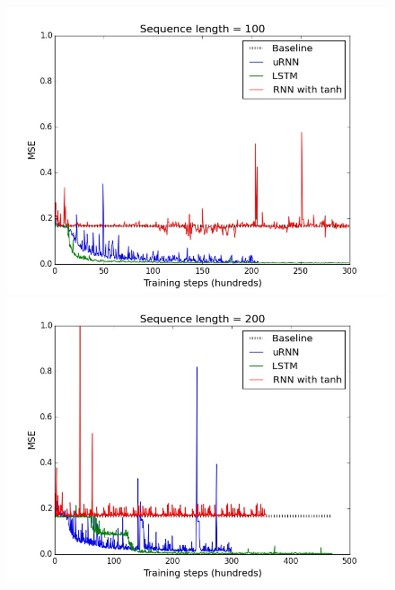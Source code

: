 \documentclass{article} %
\begin{document}
\begin{figure}[t!] 
  \begin{minipage}[b]{0.5\linewidth}
    \centering
    \includegraphics[scale=0.25]{figures/adding_100.jpeg}
  \end{minipage}%
  \begin{minipage}[b]{0.5\linewidth}
    \centering
    \includegraphics[scale=0.25]{figures/adding_200.jpeg}
    \end{minipage} 
  \begin{minipage}[b]{0.5\linewidth}
    \centering

\end{minipage}
\end{figure}
\end{document}
